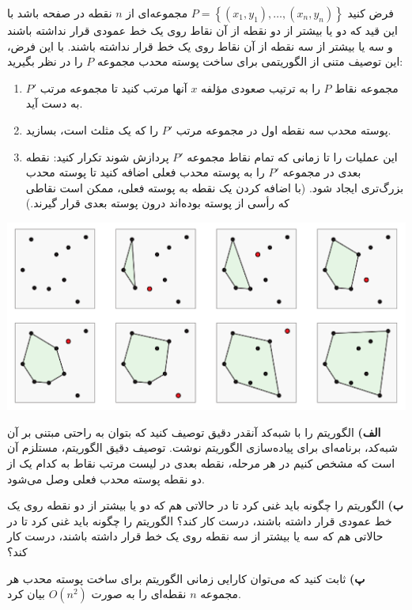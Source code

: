 \documentclass{article}
\begin{document}
فرض کنید 
$P=\left\{\left(x_1, y_1\right),\ldots, \left(x_n, y_n\right)\right\}$ 
مجموعه‌ای ‌از 
$n$
نقطه در صفحه باشد با این قید که دو یا بیشتر از دو نقطه از آن نقاط روی یک خط عمودی قرار نداشته باشند
و سه یا بیشتر از سه نقطه از آن نقاط روی یک خط قرار نداشته باشند.
 با این فرض، این توصیف متنی از الگوریتمی برای ساخت پوسته‌ محدب مجموعه 
$P$ 
را در نظر بگیرید: 
 
\begin{enumerate}
    \item 
    مجموعه نقاط 
    $P$
    را به ترتیب صعودی مؤلفه 
    $x$
    آنها مرتب کنید تا مجموعه مرتب
    $P'$
    به دست آید. 

    \item 
    پوسته محدب سه نقطه اول در مجموعه مرتب
    $P'$ 
    را که یک مثلث است، 
    بسازید. 

    \item این عملیات را تا زمانی که تمام نقاط مجموعه 
    $P'$ 
    پردازش شوند تکرار کنید: 
    نقطه بعدی در مجموعه 
    $P'$
    را به پوسته محدب فعلی اضافه کنید تا پوسته محدب بزرگ‌تری ایجاد شود. 
    (با اضافه کردن یک نقطه به پوسته فعلی، 
    ممکن است نقاطی که رأسی از پوسته بوده‌اند درون پوسته بعدی قرار گیرند.)


\end{enumerate}

\begin{center}

  \includegraphics[scale=0.6]{./5_0.png}

\end{center}

\textbf{الف)} الگوریتم را با شبه‌کد آنقدر دقیق توصیف کنید که بتوان به راحتی
 مبتنی بر آن شبه‌کد، برنامه‌ای برای پیاده‌سازی الگوریتم نوشت.
 توصیف دقیق الگوریتم، مستلزم آن است که مشخص کنیم در هر مرحله،
 نقطه بعدی در لیست مرتب نقاط به کدام یک از دو نقطه پوسته محدب فعلی وصل می‌شود.

\textbf{ب)}
الگوریتم را چگونه باید غنی کرد تا در حالاتی هم که دو یا بیشتر از دو نقطه روی یک خط عمودی قرار داشته باشند، درست کار کند؟
الگوریتم را چگونه باید غنی کرد تا در حالاتی هم که سه یا بیشتر از سه نقطه روی یک خط قرار داشته باشند، درست کار کند؟  

\textbf{پ)}
ثابت کنید که می‌توان کارایی زمانی الگوریتم برای ساخت پوسته محدب هر مجموعه
$n$
  نقطه‌ای را به صورت 
  $O(n^2)$
  بیان کرد. 
\end{document}
